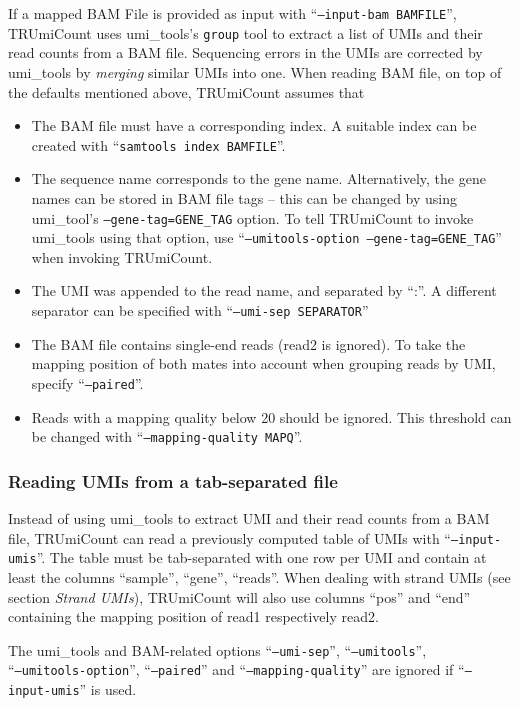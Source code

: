 \documentclass[10pt]{article}
\begin{document}
If a mapped BAM File is provided as input with ``\texttt{--input-bam BAMFILE}'', TRUmiCount uses umi\_tools's \texttt{group} tool to extract a list of UMIs and their read counts from a BAM file. Sequencing errors in the UMIs are corrected by umi\_tools by \emph{merging} similar UMIs into one. When reading BAM file, on top of the defaults mentioned above, TRUmiCount assumes that
\begin{itemize}
  \item The BAM file must have a corresponding index. A suitable index can be created with ``\texttt{samtools index BAMFILE}''.
  \item The sequence name corresponds to the gene name. Alternatively, the gene names can be stored in BAM file tags -- this can be changed by using umi\_tool's \texttt{--gene-tag=GENE\_TAG} option. To tell TRUmiCount to invoke umi\_tools using that option, use ``\texttt{--umitools-option --gene-tag=\allowbreak GENE\_TAG}'' when invoking TRUmiCount.
  \item The UMI was appended to the read name, and separated by ``:''. A different separator can be specified with ``\texttt{--umi-sep SEPARATOR}''
  \item The BAM file contains single-end reads (read2 is ignored). To take the mapping position of both mates into account when grouping reads by UMI, specify ``\texttt{--paired}''.
  \item Reads with a mapping quality below 20 should be ignored. This threshold can be changed with ``\texttt{--mapping-quality MAPQ}''.
\end{itemize}

\subsubsection*{Reading UMIs from a tab-separated file}

Instead of using umi\_tools to extract UMI and their read counts from a BAM file, TRUmiCount can read a previously computed table of UMIs with ``\texttt{--input-umis}''. The table must be tab-separated with one row per UMI and contain at least the columns ``sample'', ``gene'', ``reads''. When dealing with strand UMIs (see section \emph{Strand UMIs}), TRUmiCount will also use columns ``pos'' and ``end'' containing the mapping position of read1 respectively read2. 

The umi\_tools and BAM-related options ``\texttt{--umi-sep}'', ``\texttt{--umitools}'',\\``\texttt{--umitools-option}'', ``\texttt{--paired}'' and ``\texttt{--mapping-quality}'' are ignored if ``\texttt{--input-umis}'' is used.
\end{document}
